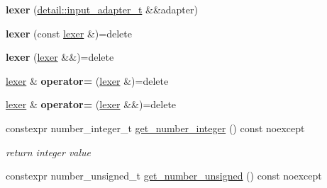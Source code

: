 \begin{DoxyCompactItemize}
\item 
\mbox{\label{classnlohmann_1_1detail_1_1lexer_ab6818e0fc05f4a52c65aeb967dd79919}} 
{\bfseries lexer} (\mbox{\hyperlink{namespacenlohmann_1_1detail_ae132f8cd5bb24c5e9b40ad0eafedf1c2}{detail\+::input\+\_\+adapter\+\_\+t}} \&\&adapter)
\item 
\mbox{\label{classnlohmann_1_1detail_1_1lexer_a2e8ce2a0d266d148b69dfbcc2e4ad71a}} 
{\bfseries lexer} (const \mbox{\hyperlink{classnlohmann_1_1detail_1_1lexer}{lexer}} \&)=delete
\item 
\mbox{\label{classnlohmann_1_1detail_1_1lexer_a9045348915010649fad1f15e80b6e34d}} 
{\bfseries lexer} (\mbox{\hyperlink{classnlohmann_1_1detail_1_1lexer}{lexer}} \&\&)=delete
\item 
\mbox{\label{classnlohmann_1_1detail_1_1lexer_a33e97dee7c5faf1b36aff5b74a6c8f55}} 
\mbox{\hyperlink{classnlohmann_1_1detail_1_1lexer}{lexer}} \& {\bfseries operator=} (\mbox{\hyperlink{classnlohmann_1_1detail_1_1lexer}{lexer}} \&)=delete
\item 
\mbox{\label{classnlohmann_1_1detail_1_1lexer_af8ab91a774484fa220ba073421c8f452}} 
\mbox{\hyperlink{classnlohmann_1_1detail_1_1lexer}{lexer}} \& {\bfseries operator=} (\mbox{\hyperlink{classnlohmann_1_1detail_1_1lexer}{lexer}} \&\&)=delete
\item 
\mbox{\label{classnlohmann_1_1detail_1_1lexer_afa338d17c0a7e834c73104258a2c8ced}} 
constexpr number\+\_\+integer\+\_\+t \mbox{\hyperlink{classnlohmann_1_1detail_1_1lexer_afa338d17c0a7e834c73104258a2c8ced}{get\+\_\+number\+\_\+integer}} () const noexcept
\begin{DoxyCompactList}\small\item\em return integer value \end{DoxyCompactList}\item 
\mbox{\label{classnlohmann_1_1detail_1_1lexer_a56640fb92293e0c17742ca3c814d74d6}} 
constexpr number\+\_\+unsigned\+\_\+t \mbox{\hyperlink{classnlohmann_1_1detail_1_1lexer_a56640fb92293e0c17742ca3c814d74d6}{get\+\_\+number\+\_\+unsigned}} () const noexcept

\end{DoxyCompactItemize}
